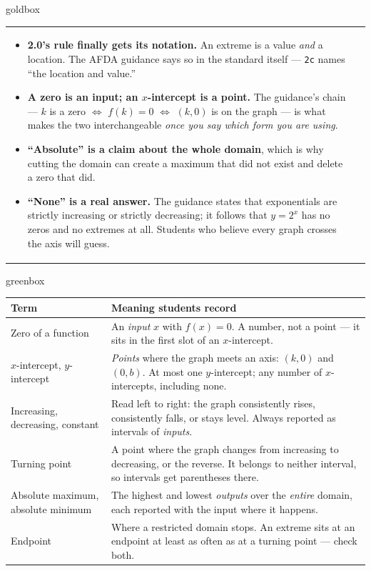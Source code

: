 \documentclass[10pt]{article}
\begin{document}
\begin{skillbox}{goldbox}
\begin{tabularx}{\linewidth}{@{}X|X@{}}
\begin{minipage}[t]{\linewidth}
\begin{itemize}[leftmargin=1.1em, itemsep=2pt, topsep=2pt]
{        axis it came from.}
  \item \textbf{2.0's rule finally gets its notation.} An extreme is a value \emph{and} a location.
        The AFDA guidance says so in the standard itself --- \texttt{2c} names ``the location and
        value.''
  \item \textbf{A zero is an input; an $x$-intercept is a point.} The guidance's chain --- $k$ is a
        zero $\Leftrightarrow$ $f(k)=0$ $\Leftrightarrow$ $(k,0)$ is on the graph --- is what makes
        the two interchangeable \emph{once you say which form you are using}.
  \item \textbf{``Absolute'' is a claim about the whole domain}, which is why cutting the domain can
        create a maximum that did not exist and delete a zero that did.
  \item \textbf{``None'' is a real answer.} The guidance states that exponentials are strictly
        increasing or strictly decreasing; it follows that $y=2^x$ has no zeros and no extremes at
        all. Students who believe every graph crosses the axis will guess.
\end{itemize}
\end{minipage}
\end{tabularx}
\end{skillbox}

\begin{skillbox}{greenbox}
\renewcommand{\arraystretch}{1.35}
\begin{tabularx}{\linewidth}{@{}p{3.6cm}X@{}}
\textbf{Term} & \textbf{Meaning students record} \\
\hline
Zero of a function & An \emph{input} $x$ with $f(x)=0$. A number, not a point --- it sits in the
    first slot of an $x$-intercept. \\
$x$-intercept, $y$-intercept & \emph{Points} where the graph meets an axis: $(k,0)$ and $(0,b)$. At
    most one $y$-intercept; any number of $x$-intercepts, including none. \\
Increasing, decreasing, constant & Read left to right: the graph consistently rises, consistently
    falls, or stays level. Always reported as intervals of \emph{inputs}. \\
Turning point & A point where the graph changes from increasing to decreasing, or the reverse. It
    belongs to neither interval, so intervals get parentheses there. \\
Absolute maximum, absolute minimum & The highest and lowest \emph{outputs} over the \emph{entire}
    domain, each reported with the input where it happens. \\
Endpoint & Where a restricted domain stops. An extreme sits at an endpoint at least as often as at a
    turning point --- check both. \\
\end{tabularx}
\end{skillbox}
\end{document}
